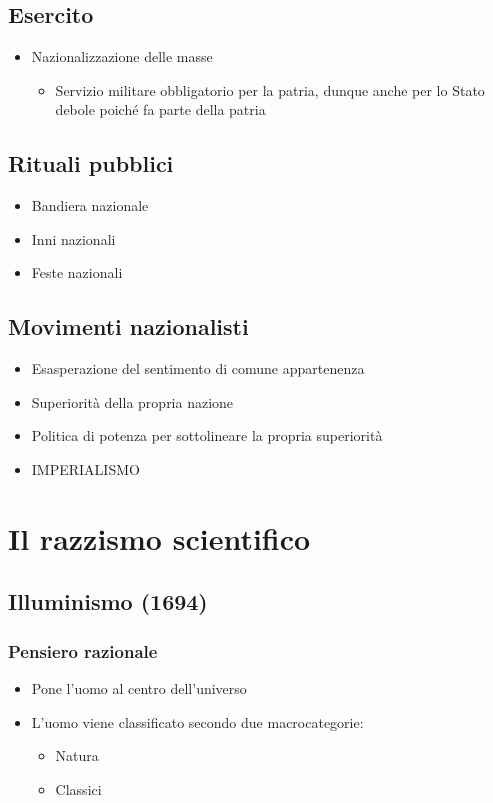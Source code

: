 \documentclass{article}
\begin{document}
\subsection{Esercito}
\begin{itemize}
    \item Nazionalizzazione delle masse
    \begin{itemize}
        \item Servizio militare obbligatorio per la patria, dunque anche per lo Stato debole poiché fa parte della patria
    \end{itemize}
\end{itemize}

\subsection{Rituali pubblici}
\begin{itemize}
    \item Bandiera nazionale
    \item Inni nazionali
    \item Feste nazionali
\end{itemize}

\subsection{Movimenti nazionalisti}
\begin{itemize}
    \item Esasperazione del sentimento di comune appartenenza
    \item Superiorità della propria nazione
    \item Politica di potenza per sottolineare la propria superiorità
    \item IMPERIALISMO
\end{itemize}

\section{Il razzismo scientifico}

\subsection{Illuminismo (1694)}

\subsubsection{Pensiero razionale}
\begin{itemize}
    \item Pone l’uomo al centro dell’universo
    \item L’uomo viene classificato secondo due macrocategorie:
    \begin{itemize}
        \item Natura
        \item Classici
    \end{itemize}
\end{itemize}
\end{document}
